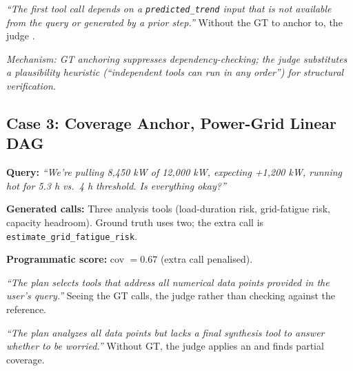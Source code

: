 \begin{correctbox}[Gemini-2.5-Pro: Without GT \hfill seq $=0.0$]
\footnotesize
\emph{``The first tool call depends on a \texttt{predicted\_trend} input that is not available from the query or generated by a prior step.''} Without the GT to anchor to, the judge .
\end{correctbox}

\smallskip
\noindent\textit{Mechanism: GT anchoring suppresses dependency-checking; the judge substitutes a plausibility heuristic (``independent tools can run in any order'') for structural verification.}

\subsection*{Case 3: Coverage Anchor, Power-Grid Linear DAG}
\begin{querybox}
\footnotesize
\textbf{Query:} \emph{``We're pulling 8,450 kW of 12,000 kW, expecting +1,200 kW, running hot for 5.3 h vs.\ 4 h threshold. Is everything okay?''}

\textbf{Generated calls:} Three analysis tools (load-duration risk, grid-fatigue risk, capacity headroom). Ground truth uses two; the extra call is \texttt{estimate\_grid\_fatigue\_risk}.

\textbf{Programmatic score:} cov $= 0.67$ (extra call penalised).
\end{querybox}

\smallskip
\begin{wrongbox}[Gemini-2.5-Pro: With GT \hfill cov $=1.0$]
\footnotesize
\emph{``The plan selects tools that address all numerical data points provided in the user's query.''} Seeing the GT calls, the judge  rather than checking against the reference.
\end{wrongbox}

\begin{correctbox}[Gemini-2.5-Pro: Without GT \hfill cov $=0.5$]
\footnotesize
\emph{``The plan analyzes all data points but lacks a final synthesis tool to answer whether to be worried.''} Without GT, the judge applies an  and finds partial coverage.
\end{correctbox}

